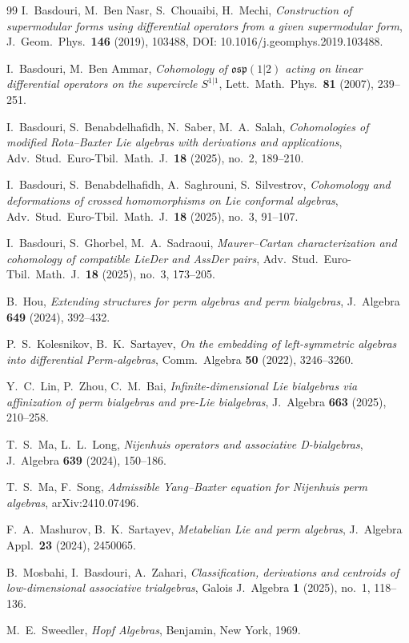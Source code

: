 \documentclass[11pt]{article}
\theoremstyle{definition}
\begin{document}
\begin{thebibliography}{99}
 I.~Basdouri, M.~Ben Nasr, S.~Chouaibi, H.~Mechi,
\emph{Construction of supermodular forms using differential operators from a given supermodular form},
J.\ Geom.\ Phys.\ \textbf{146} (2019), 103488,
DOI: 10.1016/j.geomphys.2019.103488.

 I.~Basdouri, M.~Ben Ammar,
\emph{Cohomology of $\mathfrak{osp}(1|2)$ acting on linear differential operators on the supercircle $S^{1|1}$},
Lett.\ Math.\ Phys.\ \textbf{81} (2007), 239--251.

 I.~Basdouri, S.~Benabdelhafidh, N.~Saber, M.~A.~Salah,
\emph{Cohomologies of modified Rota--Baxter Lie algebras with derivations and applications},
Adv.\ Stud.\ Euro-Tbil.\ Math.\ J.\ \textbf{18} (2025), no.~2, 189--210.

 I.~Basdouri, S.~Benabdelhafidh, A.~Saghrouni, S.~Silvestrov,
\emph{Cohomology and deformations of crossed homomorphisms on Lie conformal algebras},
Adv.\ Stud.\ Euro-Tbil.\ Math.\ J.\ \textbf{18} (2025), no.~3, 91--107.

 I.~Basdouri, S.~Ghorbel, M.~A.~Sadraoui,
\emph{Maurer--Cartan characterization and cohomology of compatible LieDer and AssDer pairs},
Adv.\ Stud.\ Euro-Tbil.\ Math.\ J.\ \textbf{18} (2025), no.~3, 173--205.

 B.~Hou,
\emph{Extending structures for perm algebras and perm bialgebras},
J.~Algebra \textbf{649} (2024), 392--432.

 P.~S.~Kolesnikov, B.~K.~Sartayev,
\emph{On the embedding of left-symmetric algebras into differential Perm-algebras},
Comm.\ Algebra \textbf{50} (2022), 3246--3260.

 Y.~C.~Lin, P.~Zhou, C.~M.~Bai,
\emph{Infinite-dimensional Lie bialgebras via affinization of perm bialgebras and pre-Lie bialgebras},
J.~Algebra \textbf{663} (2025), 210--258.

 T.~S.~Ma, L.~L.~Long,
\emph{Nijenhuis operators and associative D-bialgebras},
J.~Algebra \textbf{639} (2024), 150--186.

 T.~S.~Ma, F.~Song,
\emph{Admissible Yang--Baxter equation for Nijenhuis perm algebras},
arXiv:2410.07496.

 F.~A.~Mashurov, B.~K.~Sartayev,
\emph{Metabelian Lie and perm algebras},
J.~Algebra Appl.\ \textbf{23} (2024), 2450065.

 B.~Mosbahi, I.~Basdouri, A.~Zahari,
\emph{Classification, derivations and centroids of low-dimensional associative trialgebras},
Galois J.\ Algebra \textbf{1} (2025), no.~1, 118--136.

 M.~E.~Sweedler,
\emph{Hopf Algebras}, Benjamin, New York, 1969.
\end{thebibliography}
\end{document}

